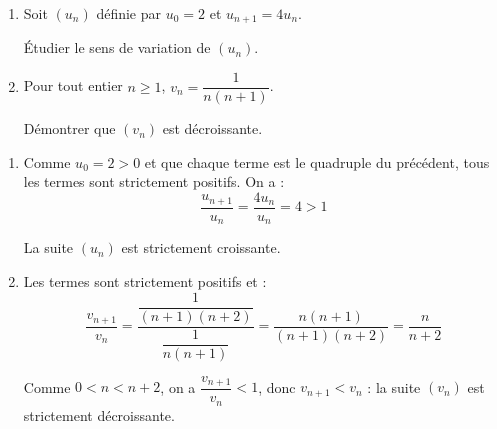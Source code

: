 \begin{methode}
	\nline
	\begin{enumerate}
		\item Soit $(u_n)$ définie par $u_0 = 2$ et $u_{n+1} = 4u_n$.

		      Étudier le sens de variation de $(u_n)$.
		\item Pour tout entier $n \geq 1$, $v_n = \dfrac{1}{n(n + 1)}$.

		      Démontrer que $(v_n)$ est décroissante.
	\end{enumerate}

	\begin{correction}
		\nline
		\begin{enumerate}
			\item Comme $u_0 = 2 > 0$ et que chaque terme est le quadruple du précédent, tous les termes sont strictement positifs. On a :
			      \[
				      \dfrac{u_{n+1}}{u_n} = \dfrac{4u_n}{u_n} = 4 > 1
			      \]

			      La suite $(u_n)$ est strictement croissante.
			\item Les termes sont strictement positifs et :
			      \[
				      \dfrac{v_{n+1}}{v_n} = \dfrac{\dfrac{1}{(n + 1)(n + 2)}}{\dfrac{1}{n(n + 1)}} = \dfrac{n(n + 1)}{(n + 1)(n + 2)} = \dfrac{n}{n + 2}
			      \]

			      Comme $0 < n < n + 2$, on a $\dfrac{v_{n+1}}{v_n} < 1$, donc $v_{n+1} < v_n$ : la suite $(v_n)$ est strictement décroissante.
		\end{enumerate}
	\end{correction}
\end{methode}

